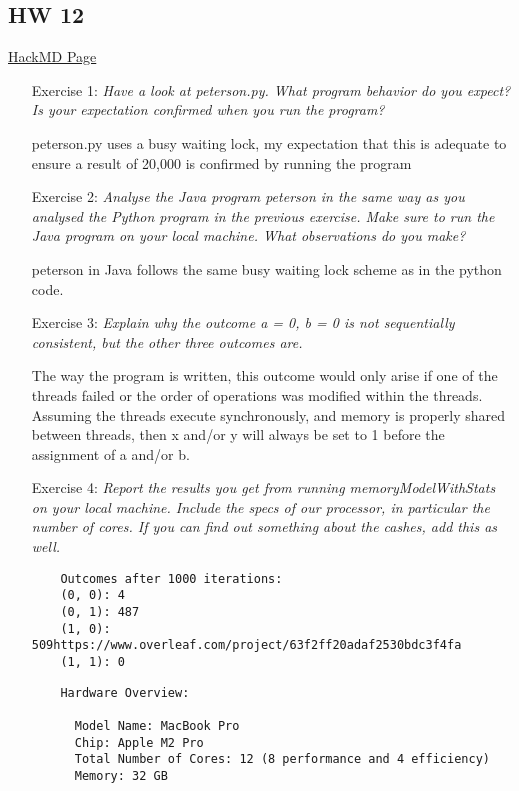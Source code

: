 \documentclass{article}
\theoremstyle{theorem}
\theoremstyle{definition}
\theoremstyle{remark}
\begin{document}
\subsection{HW 12}

\href{https://hackmd.io/@alexhkurz/ryEdSuVXh}{HackMD Page}\\
\begin{itemize}
    \item[Exercise 1:] \textit{Have a look at peterson.py. What program behavior do you expect? Is your expectation confirmed when you run the program?}
    
    peterson.py uses a busy waiting lock, my expectation that this is adequate to ensure a result of 20,000 is confirmed by running the program

    \item[Exercise 2:] \textit{Analyse the Java program peterson in the same way as you analysed the Python program in the previous exercise. Make sure to run the Java program on your local machine. What observations do you make?}

    peterson in Java follows the same busy waiting lock scheme as in the python code.

    \item[Exercise 3:] \textit{Explain why the outcome
    a = 0, b = 0
    is not sequentially consistent, but the other three outcomes are.}
    
    The way the program is written, this outcome would only arise if one of the threads failed or the order of operations was modified within the threads. Assuming the threads execute synchronously, and memory is properly shared between threads, then x and/or y will always be set to 1 before the assignment of a and/or b. 

    \item[Exercise 4:] \textit{Report the results you get from running memoryModelWithStats on your local machine. Include the specs of our processor, in particular the number of cores. If you can find out something about the cashes, add this as well.}
\begin{verbatim}
    Outcomes after 1000 iterations:
    (0, 0): 4
    (0, 1): 487
    (1, 0): 509https://www.overleaf.com/project/63f2ff20adaf2530bdc3f4fa
    (1, 1): 0
\end{verbatim}

\begin{verbatim}
    Hardware Overview:

      Model Name: MacBook Pro
      Chip: Apple M2 Pro
      Total Number of Cores: 12 (8 performance and 4 efficiency)
      Memory: 32 GB
\end{verbatim}
    


\end{itemize}
\end{document}
